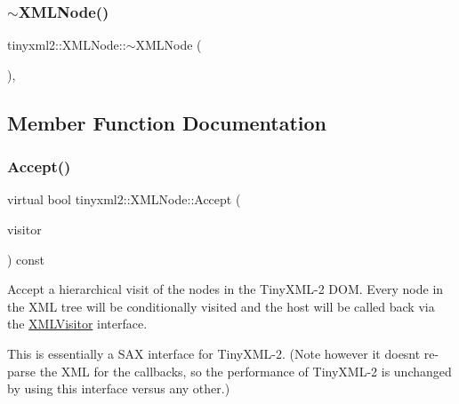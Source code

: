 \mbox{\label{classtinyxml2_1_1_x_m_l_node_a8f41e898cdd4da4cdbb7f05b0c7d9f69}} 
\subsubsection{\texorpdfstring{$\sim$\+X\+M\+L\+Node()}{~XMLNode()}}
{\footnotesize\ttfamily tinyxml2\+::\+X\+M\+L\+Node\+::$\sim$\+X\+M\+L\+Node (\begin{DoxyParamCaption}{ }\end{DoxyParamCaption})\hspace{0.3cm}{\ttfamily [protected]}, {\ttfamily [virtual]}}



\subsection{Member Function Documentation}
\mbox{\label{classtinyxml2_1_1_x_m_l_node_a81e66df0a44c67a7af17f3b77a152785}} 
\subsubsection{\texorpdfstring{Accept()}{Accept()}}
{\footnotesize\ttfamily virtual bool tinyxml2\+::\+X\+M\+L\+Node\+::\+Accept (\begin{DoxyParamCaption}\item[{\mbox{\hyperlink{classtinyxml2_1_1_x_m_l_visitor}{X\+M\+L\+Visitor}} $\ast$}]{visitor }\end{DoxyParamCaption}) const\hspace{0.3cm}{\ttfamily [pure virtual]}}

Accept a hierarchical visit of the nodes in the Tiny\+X\+M\+L-\/2 D\+OM. Every node in the X\+ML tree will be conditionally visited and the host will be called back via the \mbox{\hyperlink{classtinyxml2_1_1_x_m_l_visitor}{X\+M\+L\+Visitor}} interface.

This is essentially a S\+AX interface for Tiny\+X\+M\+L-\/2. (Note however it doesn\textquotesingle{}t re-\/parse the X\+ML for the callbacks, so the performance of Tiny\+X\+M\+L-\/2 is unchanged by using this interface versus any other.)

